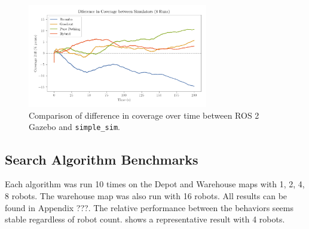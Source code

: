 \begin{figure}[H]
    \begin{center}
        \includegraphics[width=0.70\textwidth]{./figures/plots/consistency/sim_coverage_diff.png}
    \end{center}
    \caption{Comparison of difference in coverage over time between ROS 2 Gazebo and \texttt{simple\_sim}.}
    \label{fig:coverage-benchmark-diff}
\end{figure}


\subsection{Search Algorithm Benchmarks}
Each algorithm was run 10 times on the Depot and Warehouse maps with 1, 2, 4, 8 robots. The warehouse map was also run with 16 robots. All results can be found in {\color{red} Appendix ???}. The relative performance between the behaviors seems stable regardless of robot count.  shows a representative result with 4 robots.

